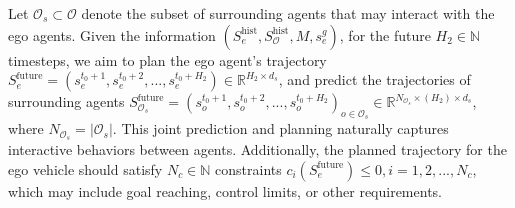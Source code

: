 Let $\mathcal{O}_s \subset \mathcal{O}$ denote the subset of surrounding agents that may interact with the ego agents.
Given the information $(S_e^{\text{hist}}, S_{\mathcal{O}}^{\text{hist}}, M, s_e^g)$, for the future $H_2 \in \mathbb{N}$ timesteps, we aim to plan the ego agent's trajectory $S_e^{\text{future}} = (s_e^{t_0+1}, s_e^{t_0+2}, ..., s_e^{t_0+H_2}) \in \mathbb{R}^{H_2 \times d_s}$, and predict the trajectories of surrounding agents $S_{\mathcal{O}_s}^{\text{future}} = (s_{o}^{t_0+1}, s_{o}^{t_0+2}, ..., s_{o}^{t_0+H_2})_{o \in \mathcal{O}_s} \in \mathbb{R}^{N_{\mathcal{O}_s} \times (H_2) \times d_s}$, where $N_{\mathcal{O}_s} = |\mathcal{O}_s|$.
This joint prediction and planning naturally captures interactive behaviors between agents.
Additionally, the planned trajectory for the ego vehicle should satisfy $N_c \in \mathbb{N}$ constraints $c_i( S_e^{\text{future}}) \leq 0, i=1,2,...,N_c$, which may include goal reaching, control limits, or other requirements.


